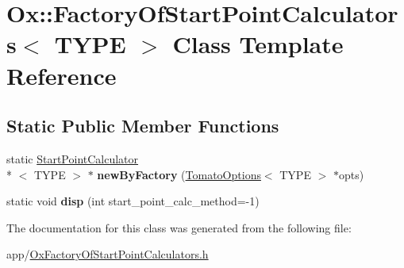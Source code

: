 \hypertarget{class_ox_1_1_factory_of_start_point_calculators}{\section{Ox\-:\-:Factory\-Of\-Start\-Point\-Calculators$<$ T\-Y\-P\-E $>$ Class Template Reference}
\label{class_ox_1_1_factory_of_start_point_calculators}
}
\subsection*{Static Public Member Functions}
\begin{DoxyCompactItemize}
\item 
\hypertarget{class_ox_1_1_factory_of_start_point_calculators_a1b2f350cc38b9d23e65bc50eee2f3c9a}{static \hyperlink{class_ox_1_1_start_point_calculator}{Start\-Point\-Calculator}\\*
$<$ T\-Y\-P\-E $>$ $\ast$ {\bfseries new\-By\-Factory} (\hyperlink{struct_ox_1_1_tomato_options}{Tomato\-Options}$<$ T\-Y\-P\-E $>$ $\ast$opts)}\label{class_ox_1_1_factory_of_start_point_calculators_a1b2f350cc38b9d23e65bc50eee2f3c9a}

\item 
\hypertarget{class_ox_1_1_factory_of_start_point_calculators_afa7e657794cfcd6cb8e2b3489ec6f0af}{static void {\bfseries disp} (int start\-\_\-point\-\_\-calc\-\_\-method=-\/1)}\label{class_ox_1_1_factory_of_start_point_calculators_afa7e657794cfcd6cb8e2b3489ec6f0af}

\end{DoxyCompactItemize}


The documentation for this class was generated from the following file\-:\begin{DoxyCompactItemize}
\item 
app/\hyperlink{_ox_factory_of_start_point_calculators_8h}{Ox\-Factory\-Of\-Start\-Point\-Calculators.\-h}\end{DoxyCompactItemize}
